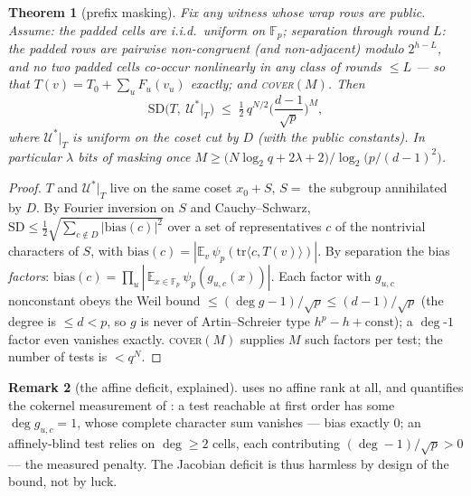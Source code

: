 \documentclass{article}
\newcommand{\Fp}{\mathbb{F}_p}
\newtheorem{theorem}{Theorem}[section]
\theoremstyle{definition}
\newtheorem{remark}[theorem]{Remark}
\begin{document}
\begin{theorem}[prefix masking]\label{thm:prefix}
Fix any witness whose wrap rows are public. Assume: the padded cells are i.i.d.\ uniform on $\Fp$; \emph{separation through round $L$}: the padded rows are pairwise non-congruent (and non-adjacent) modulo $2^{h-L}$, and no two padded cells co-occur nonlinearly in any class of rounds $\leq L$ --- so that $T(v) = T_0 + \sum_u F_u(v_u)$ exactly; and \textsc{cover}$(M)$. Then
\[
\mathrm{SD}\big(T,\ \mathcal{U}^*\big|_T\big) \;\leq\; \tfrac12\, q^{N/2} \Big(\frac{d-1}{\sqrt{p}}\Big)^{M} ,
\]
where $\mathcal{U}^*|_T$ is uniform on the coset cut by $D$ (with the public constants). In particular $\lambda$ bits of masking once $M \geq \big(N \log_2 q + 2\lambda + 2\big) / \log_2\!\big(p/(d-1)^2\big)$.
\end{theorem}

\begin{proof}
$T$ and $\mathcal{U}^*|_T$ live on the same coset $x_0 + S$, $S = $ the subgroup annihilated by $D$. By Fourier inversion on $S$ and Cauchy--Schwarz, $\mathrm{SD} \leq \tfrac12 \sqrt{\sum_{c \notin D} |\mathrm{bias}(c)|^2}$ over a set of representatives $c$ of the nontrivial characters of $S$, with $\mathrm{bias}(c) = |\mathbb{E}_v\, \psi_p(\mathrm{tr}\langle c, T(v)\rangle)|$. By separation the bias \emph{factors}: $\mathrm{bias}(c) = \prod_u |\,\mathbb{E}_{x \in \Fp}\, \psi_p(g_{u,c}(x))|$. Each factor with $g_{u,c}$ nonconstant obeys the Weil bound $\leq (\deg g - 1)/\sqrt{p} \leq (d-1)/\sqrt{p}$ (the degree is $\leq d < p$, so $g$ is never of Artin--Schreier type $h^p - h + \mathrm{const}$); a $\deg$-$1$ factor even vanishes exactly. \textsc{cover}$(M)$ supplies $M$ such factors per test; the number of tests is $< q^N$.
\end{proof}

\begin{remark}[the affine deficit, explained]\label{rem:weil-affine}
 uses no affine rank at all, and quantifies the cokernel measurement of : a test reachable at first order has some $\deg g_{u,c} = 1$, whose complete character sum vanishes --- bias exactly $0$; an affinely-blind test relies on $\deg \geq 2$ cells, each contributing $(\deg - 1)/\sqrt{p} > 0$ --- the measured penalty. The Jacobian deficit is thus harmless by design of the bound, not by luck.
\end{remark}
\end{document}
